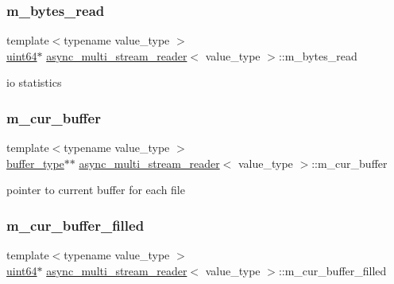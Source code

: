 \subsubsection{\texorpdfstring{m\+\_\+bytes\+\_\+read}{m\_bytes\_read}}
{\footnotesize\ttfamily template$<$typename value\+\_\+type $>$ \\
\hyperlink{types_8h_a60e8696a4678cd348e991a1f172e53f7}{uint64}$\ast$ \hyperlink{classasync__multi__stream__reader}{async\+\_\+multi\+\_\+stream\+\_\+reader}$<$ value\+\_\+type $>$\+::m\+\_\+bytes\+\_\+read\hspace{0.3cm}{\ttfamily [private]}}



io statistics 

\mbox{\label{classasync__multi__stream__reader_aeedea79263b0e41a5fd3264b26aa39a8}} 
\subsubsection{\texorpdfstring{m\+\_\+cur\+\_\+buffer}{m\_cur\_buffer}}
{\footnotesize\ttfamily template$<$typename value\+\_\+type $>$ \\
\hyperlink{classasync__multi__stream__reader_ad58ad834dc6d741a12be1fb442b8e5d6}{buffer\+\_\+type}$\ast$$\ast$ \hyperlink{classasync__multi__stream__reader}{async\+\_\+multi\+\_\+stream\+\_\+reader}$<$ value\+\_\+type $>$\+::m\+\_\+cur\+\_\+buffer\hspace{0.3cm}{\ttfamily [private]}}



pointer to current buffer for each file 

\mbox{\label{classasync__multi__stream__reader_a7583fa561610fcc9f620d3ad5539e488}} 
\subsubsection{\texorpdfstring{m\+\_\+cur\+\_\+buffer\+\_\+filled}{m\_cur\_buffer\_filled}}
{\footnotesize\ttfamily template$<$typename value\+\_\+type $>$ \\
\hyperlink{types_8h_a60e8696a4678cd348e991a1f172e53f7}{uint64}$\ast$ \hyperlink{classasync__multi__stream__reader}{async\+\_\+multi\+\_\+stream\+\_\+reader}$<$ value\+\_\+type $>$\+::m\+\_\+cur\+\_\+buffer\+\_\+filled\hspace{0.3cm}{\ttfamily [private]}}



